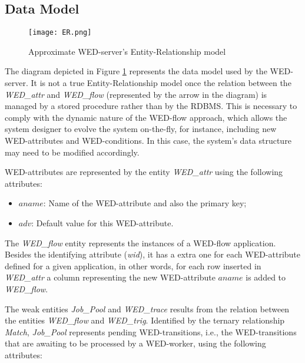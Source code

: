 \documentclass[12pt]{article}
\begin{document}
\subsection{Data Model}

\begin{figure}[!t]
\centering
\texttt{[image: ER.png]}
\caption{Approximate WED-server's Entity-Relationship model}
\label{fig_er}

\end{figure}
 The diagram depicted in Figure \ref{fig_er} represents the data model used by the WED-server. It is not a true Entity-Relationship model once the relation between the \emph{WED\_attr} and \emph{WED\_flow} (represented by the arrow in the diagram) is 
managed by a stored procedure rather than by the RDBMS. This is necessary to comply with the dynamic nature of the WED-flow approach, which allows the system designer to evolve the system on-the-fly, for instance, including new WED-attributes and 
WED-conditions. In this case, the system's data structure may need to be modified accordingly. 

\par WED-attributes are represented by the entity \emph{WED\_attr} using the following attributes:
\begin{itemize}
\item $aname$: Name of the WED-attribute and also the primary key;
\item $adv$: Default value for this WED-attribute.
\end{itemize}

The \emph{WED\_flow} entity represents the instances of a WED-flow application. Besides the identifying attribute (\emph{wid}), it has a extra one for each WED-attribute defined for a given application, in other words, for each row inserted in \emph{WED\_attr}
a column representing the new WED-attribute  $aname$  is added to \emph{WED\_flow}.

\par The weak entities \emph{Job\_Pool} and \emph{WED\_trace} results from the relation between the entities \emph{WED\_flow} and  \emph{WED\_trig}. Identified by the ternary relationship \emph{Match}, \emph{Job\_Pool} represents pending WED-transitions, i.e., the WED-transitions that are  awaiting to be processed by a WED-worker, using the following attributes:
\end{document}

